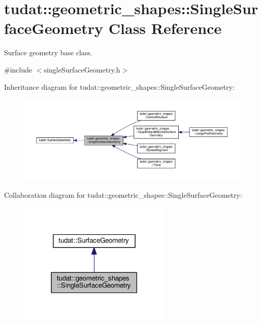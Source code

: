 \hypertarget{classtudat_1_1geometric__shapes_1_1SingleSurfaceGeometry}{}\section{tudat\+:\+:geometric\+\_\+shapes\+:\+:Single\+Surface\+Geometry Class Reference}
\label{classtudat_1_1geometric__shapes_1_1SingleSurfaceGeometry}


Surface geometry base class.  




{\ttfamily \#include $<$single\+Surface\+Geometry.\+h$>$}



Inheritance diagram for tudat\+:\+:geometric\+\_\+shapes\+:\+:Single\+Surface\+Geometry\+:
\nopagebreak
\begin{figure}[H]
\begin{center}
\leavevmode
\includegraphics[width=350pt]{classtudat_1_1geometric__shapes_1_1SingleSurfaceGeometry__inherit__graph}
\end{center}
\end{figure}


Collaboration diagram for tudat\+:\+:geometric\+\_\+shapes\+:\+:Single\+Surface\+Geometry\+:
\nopagebreak
\begin{figure}[H]
\begin{center}
\leavevmode
\includegraphics[width=206pt]{classtudat_1_1geometric__shapes_1_1SingleSurfaceGeometry__coll__graph}
\end{center}
\end{figure}
